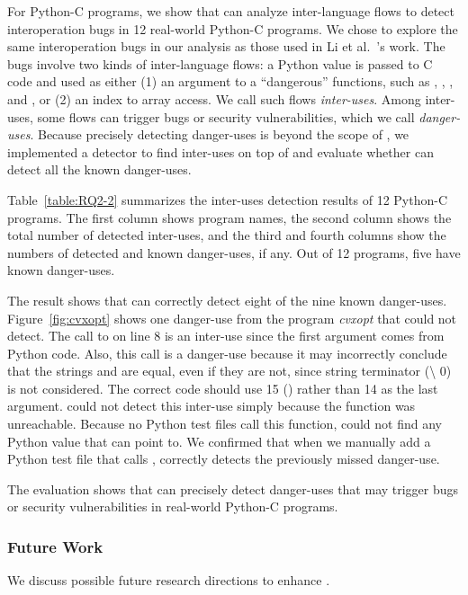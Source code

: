 For Python-C programs, we show that \ours can analyze inter-language flows to
detect interoperation bugs in 12 real-world Python-C programs.  We chose to
explore the same interoperation bugs in our analysis as those used in Li et
al.~\cite{polycruise}'s work.  The bugs involve two kinds of inter-language
flows: a Python value is passed to C code and used as either (1) an argument to
a ``dangerous'' functions, such as , ,
, and , or (2) an index to array access.  We call
such flows \textit{inter-uses}.  Among inter-uses, some flows can trigger bugs
or security vulnerabilities, which we call \textit{danger-uses}.  Because
precisely detecting danger-uses is beyond the scope of \ours, we implemented a
detector to find inter-uses on top of \ours and evaluate whether \ours can
detect all the known danger-uses.

Table~\ref{table:RQ2-2} summarizes the inter-uses detection results of 12
Python-C programs.  The first column shows program names, the second column
shows the total number of detected inter-uses, and the third and fourth columns
show the numbers of detected and known danger-uses, if any.  Out of 12
programs, five have known danger-uses.

The result shows that \ours can correctly detect eight of the nine known
danger-uses.  Figure~\ref{fig:cvxopt} shows one danger-use from the program
{\it cvxopt} that \ours could not detect.  The call to  on line
8 is an inter-use since the first argument  comes from Python
code.  Also, this call is a danger-use because it may incorrectly conclude that
the strings  and  are equal, even if they
are not, since string terminator (\textquotesingle \textbackslash
0\textquotesingle) is not considered.  The correct code should use 15
() rather than 14 as the last argument.
\ours could not detect this inter-use simply because the function
 was unreachable.  Because no Python test files call this
function, \ours could not find any Python value that  can point
to. We confirmed that when we manually add a Python test file that calls
, \ours correctly detects the previously missed danger-use.

The evaluation shows that \ours can precisely detect danger-uses that may
trigger bugs or security vulnerabilities in real-world Python-C programs.

\subsubsection{Future Work}
We discuss possible future research directions to enhance \ours.

